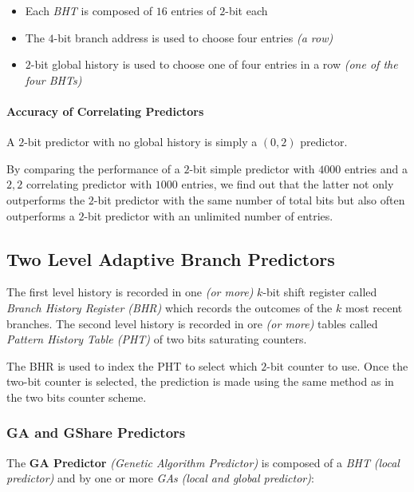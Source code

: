 \documentclass[english]{article}
\begin{document}
\begin{itemize}
  \item Each \textit{BHT} is composed of \(16\) entries of \(2\)-bit each
  \item The \(4\)-bit branch address is used to choose four entries \textit{(a row)}
  \item \(2\)-bit global history is used to choose one of four entries in a row \textit{(one of the four \textit{BHTs})}
\end{itemize}

\paragraph{Accuracy of Correlating Predictors}

A \(2\)-bit predictor with no global history is simply a \((0, 2)\) predictor.

By comparing the performance of a \(2\)-bit simple predictor with \(4000\) entries and a \(2, 2\) correlating predictor with \(1000\) entries, we find out that the latter not only outperforms the \(2\)-bit predictor with the same number of total bits but also often outperforms a \(2\)-bit predictor with an unlimited number of entries.

\subsection{Two Level Adaptive Branch Predictors}

The first level history is recorded in one \textit{(or more)} \(k\)-bit shift register called \textit{Branch History Register (BHR)} which records the outcomes of the \(k\) most recent branches.
The second level history is recorded in ore \textit{(or more)} tables called \textit{Pattern History Table (PHT)} of two bits saturating counters.

The BHR is used to index the PHT to select which \(2\)-bit counter to use.
Once the two-bit counter is selected, the prediction is made using the same method as in the two bits counter scheme.

\subsubsection{GA and GShare Predictors}

The \textbf{GA Predictor} \textit{(Genetic Algorithm Predictor)} is composed of a \textit{BHT} \textit{(local predictor)} and by one or more \textit{GAs} \textit{(local and global predictor)}:
\end{document}
